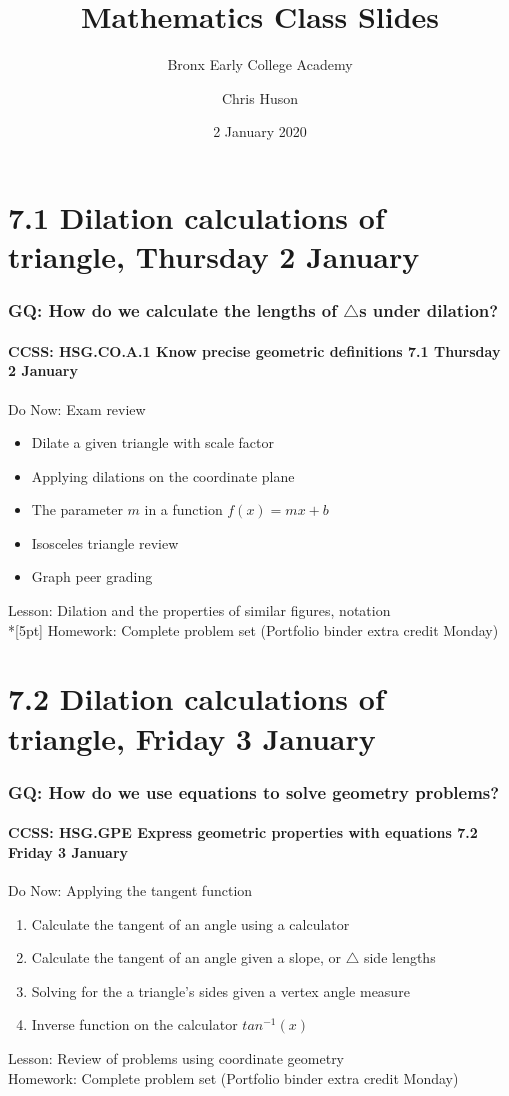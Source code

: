 \documentclass{beamer}
\title{Mathematics Class Slides}
\subtitle{Bronx Early College Academy}
\author{Chris Huson}
\date{2 January 2020}
\begin{document}
\frame{\titlepage}
\section[Outline]{}
\frame{\tableofcontents}


\section{7.1 Dilation calculations of triangle, Thursday 2 January}
\frame
{
  \frametitle{GQ: How do we calculate the lengths of $\triangle$s under dilation?}
  \framesubtitle{CCSS: HSG.CO.A.1 Know precise geometric definitions \hfill \alert{7.1 Thursday 2 January}}

  \begin{block}{Do Now: Exam review}
  \begin{itemize}
    \item Dilate a given triangle with scale factor
    \item Applying dilations on the coordinate plane
    \item The parameter $m$ in a function $f(x)=mx+b$
    \item Isosceles triangle review
    \item Graph peer grading
  \end{itemize}
  \end{block}
  Lesson: Dilation and the properties of similar figures, notation\\*[5pt]
  Homework: Complete problem set (Portfolio binder extra credit Monday)
}

\section{7.2 Dilation calculations of triangle, Friday 3 January}
\frame
{
  \frametitle{GQ: How do we use equations to solve geometry problems?}
  \framesubtitle{CCSS: HSG.GPE Express geometric properties with equations \hfill \alert{7.2 Friday 3 January}}

  \begin{block}{Do Now: Applying the tangent function}
  \begin{enumerate}
    \item Calculate the tangent of an angle using a calculator
    \item Calculate the tangent of an angle given a slope, or $\triangle$ side lengths
    \item Solving for the a triangle's sides given a vertex angle measure
    \item Inverse function on the calculator $tan^{-1}(x)$
  \end{enumerate}
  \end{block}
  Lesson: Review of problems using coordinate geometry \\
  Homework: Complete problem set (Portfolio binder extra credit Monday)
}
\end{document}
